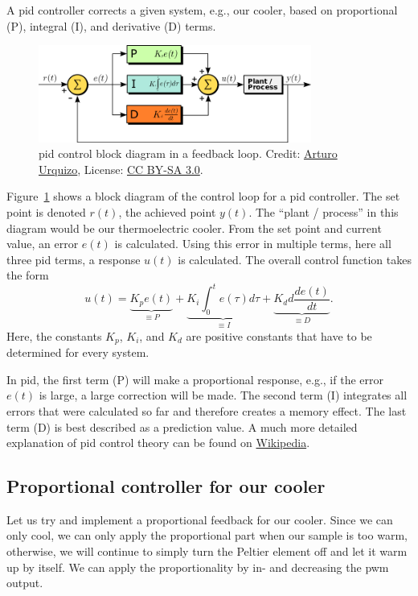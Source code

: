 A \ac{pid} controller corrects a given system, e.g., our cooler, based on proportional (P), integral (I), and derivative (D) terms. 
\begin{figure}[tb]
  \centering
  \includegraphics[width=0.8\textwidth]{graphics/06_outlook/pid.png}
  \caption{\ac{pid} control block diagram in a feedback loop. Credit: \href{https://en.wikipedia.org/wiki/File:PID_en.svg}{Arturo Urquizo}, License: \href{https://creativecommons.org/licenses/by-sa/3.0/deed.en}{CC BY-SA 3.0}.}
  \label{fig:outlook:pid}
\end{figure}
Figure~\ref{fig:outlook:pid} shows a block diagram of the control loop for a \ac{pid} controller. The set point is denoted $r(t)$, the achieved point $y(t)$. The ``plant / process'' in this diagram would be our thermoelectric cooler. From the set point and current value, an error $e(t)$ is calculated. Using this error in multiple terms, here all three \ac{pid} terms, a response $u(t)$ is calculated. The overall control function takes the form
\begin{equation}
u(t) = \underbrace{K_p e(t)}_{\equiv P} + \underbrace{K_i \int_0^t e(\tau) d\tau}_{\equiv I} + \underbrace{K_dd \frac{de(t)}{dt}}_{\equiv D}.
\end{equation}
Here, the constants $K_p$, $K_i$, and $K_d$ are positive constants that have to be determined for every system.

In \ac{pid}, the first term (P) will make a proportional response, e.g., if the error $e(t)$ is large, a large correction will be made. The second term (I) integrates all errors that were calculated so far and therefore creates a memory effect. The last term (D) is best described as a prediction value. A much more detailed explanation of \ac{pid} control theory can be found on \href{https://en.wikipedia.org/wiki/PID_controller}{Wikipedia}.


\subsection{Proportional controller for our cooler}

Let us try and implement a proportional feedback for our cooler. Since we can only cool, we can only apply the proportional part when our sample is too warm, otherwise, we will continue to simply turn the Peltier element off and let it warm up by itself. We can apply the proportionality by in- and decreasing the \ac{pwm} output. 

